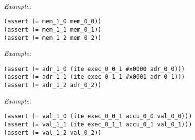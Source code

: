 ~\\
\noindent
\emph{Example:} 

\begin{lstlisting}[style=smtlib]
(assert (= mem_1_0 mem_0_0))
(assert (= mem_1_1 mem_0_1))
(assert (= mem_1_2 mem_0_2))
\end{lstlisting}



\noindent
\emph{Example:} 

\begin{lstlisting}[style=smtlib]
(assert (= adr_1_0 (ite exec_0_0_1 #x0000 adr_0_0)))
(assert (= adr_1_1 (ite exec_0_1_1 #x0001 adr_0_1)))
(assert (= adr_1_2 adr_0_2))
\end{lstlisting}



\noindent
\emph{Example:} 

\begin{lstlisting}[style=smtlib]
(assert (= val_1_0 (ite exec_0_0_1 accu_0_0 val_0_0)))
(assert (= val_1_1 (ite exec_0_1_1 accu_0_1 val_0_1)))
(assert (= val_1_2 val_0_2))
\end{lstlisting}

